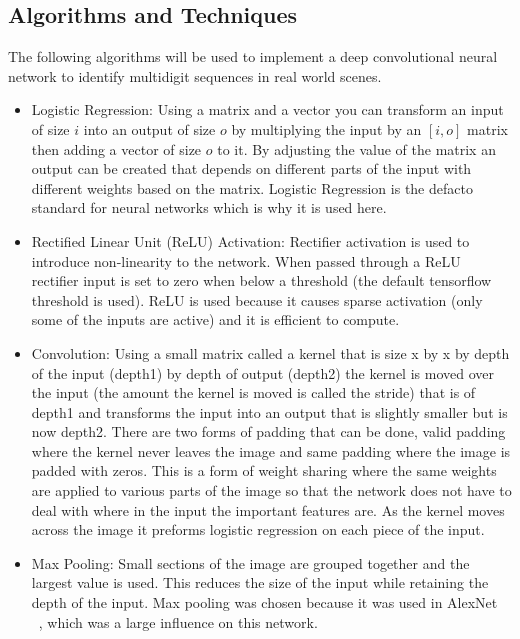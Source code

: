 \documentclass[12pt,twocolumn,letterpaper]{article}
\begin{document}
\subsection{Algorithms and Techniques}

The following algorithms will be used to implement a deep convolutional neural 
network to identify multidigit sequences in real world scenes.
\begin{itemize}
	\item Logistic Regression: Using a matrix and a vector you can transform an 
	input of size $i$ into an output of size $o$ by multiplying the input by an 
	$[i, o]$ matrix then adding a vector of size $o$ to it. By adjusting the 
	value of the matrix an output can be created that depends on different parts
	of the input with different weights based on the matrix. Logistic Regression 
	is the defacto standard for neural networks which is why it is used here.
	\item Rectified Linear Unit (ReLU) Activation: Rectifier activation is used 
	to introduce non-linearity to the network. When passed through a ReLU 
	rectifier input is set to zero when below a threshold (the default 
	tensorflow threshold is used). ReLU is used because it causes sparse 
	activation (only some of the inputs are active) and it is efficient to 
	compute.
	\item Convolution: Using a small matrix called a kernel that is size x by x 
	by depth of the input (depth1) by depth of output (depth2) the kernel is moved
	over the input (the amount the kernel is moved is called the stride) 
	that is of depth1 and transforms the input into an output 
	that is slightly smaller but is now depth2. There are two forms of padding 
	that can be done, valid padding where the kernel never leaves the image and 
	same padding where the image is padded with zeros. This is a form of weight sharing 
	where the same weights are applied to various parts of the image so that the 
	network does not have to deal with where in the input the important features 
	are. As the kernel moves across the image it preforms logistic regression on 
	each piece of the input.
	\item Max Pooling: Small sections of the image are grouped together and the 
	largest value is used. This reduces the size of the input while retaining the
	depth of the input. Max pooling was chosen because it was used in AlexNet ~\cite{alex}, 
	which was a large influence on this network.

\end{itemize}
\end{document}
